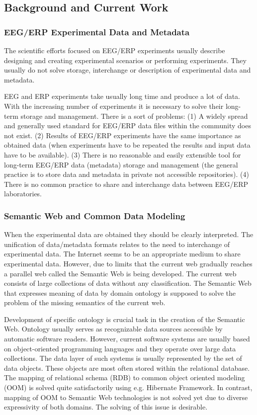 \documentclass[a4paper, 10pt]{article}
\begin{document}
\subsection*{Background and Current Work}

\subsubsection*{EEG/ERP Experimental Data and Metadata}

The scientific efforts focused on EEG/ERP experiments usually describe designing and creating experimental scenarios or performing experiments. They usually do not solve storage, interchange or description of experimental data and metadata.

EEG and ERP experiments take usually long time and produce a lot of data. With the increasing number of experiments it is necessary to solve their long-term storage and management. There is a sort of problems: (1) A widely spread and generally used standard for EEG/ERP data files within the community does not exist. (2) Results of EEG/ERP experiments have the same importance as obtained data (when experiments have to be repeated the results and input data have to be available). (3) There is no reasonable and easily extensible tool for long-term EEG/ERP data (metadata) storage and management (the general practice is to store data and metadata in private not accessible repositories). (4) There is no common practice to share and interchange data between EEG/ERP laboratories.



\subsubsection*{Semantic Web and Common Data Modeling}

When the experimental data are obtained they should be clearly interpreted. The unification of data/metadata formats relates to the need to interchange of experimental data. The Internet seems to be an appropriate medium to share experimental data. However, due to limits that the current web gradually reaches a parallel web called the Semantic Web is being developed. The current web consists of large collections of data without any classification. The Semantic Web that expresses meaning of data by domain ontology is supposed to solve the problem of the missing semantics of the current web.

Development of specific ontology is crucial task in the creation of the Semantic Web. Ontology usually serves as recognizable data sources accessible by automatic software readers. However, current software systems are usually based on object-oriented programming languages and they operate over large data collections.  The data layer of such systems is usually represented by the set of data objects. These objects are most often stored within the relational database. The mapping of relational schema (RDB) to common object oriented modeling (OOM) is solved quite satisfactorily using e.g. Hibernate Framework. In contrast, mapping of OOM to Semantic Web technologies is not solved yet due to diverse expressivity of both domains. The solving of this issue is desirable.
\end{document}
